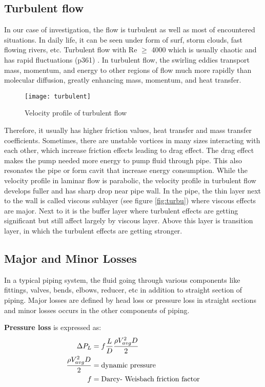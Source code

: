 \subsection{Turbulent flow}
In our case of investigation, the flow is turbulent as well as most of encountered situations. In daily life, it can be seen under form of surf, storm clouds, fast flowing rivers, etc. Turbulent flow with Re $\geq$ 4000 which is usually chaotic and has rapid fluctuations (p361) \cite{cengel:book}. In turbulent flow, the swirling eddies transport mass, momentum, and energy to other regions of flow much more rapidly than molecular diffusion, greatly enhancing mass, momentum, and heat transfer. 
\begin{wrapfigure}{r}{0.5\textwidth}
  \begin{center}
    \texttt{[image: turbulent]}
  \end{center}
  \caption{Velocity profile of turbulent flow \cite{cengel:book}}
  \label{fig:turbu}
\end{wrapfigure}
Therefore, it usually has higher friction values, heat transfer and mass transfer coefficients. Sometimes, there are unstable vortices in many sizes interacting with each other, which increase friction effects leading to drag effect. The drag effect makes the pump needed more energy to pump fluid through pipe. This  also resonates the pipe or form \gls{cavit} that increase energy consumption. While the velocity profile in laminar flow is parabolic, the velocity profile in turbulent flow develops fuller and has sharp drop near pipe wall.  In the pipe, the thin layer next to the wall is called viscous sublayer (see figure \vref{fig:turbu}) where viscous effects are major. Next to it is the buffer layer where turbulent effects are getting significant but still affect largely by viscous layer. Above this layer is transition layer, in which the turbulent effects are getting stronger. 

\subsection{Major and Minor Losses}
In a typical piping system, the fluid going through various components like fittings, valves, bends, elbows, reducer, etc in addition to straight section of piping. Major losses are defined by head loss or pressure loss in straight sections and minor losses occurs in the other components of piping. 

\textbf{Pressure loss} is expressed as:
\begin{align}
\Delta P_L & = f \frac{L}{D} \frac{\rho V_{avg}^2 D }{2}   \\
\frac{\rho V_{avg}^2 D }{2}   & = \textnormal{dynamic pressure} \\
f & = \textnormal{Darcy- Weisbach friction factor} 
\end{align}

